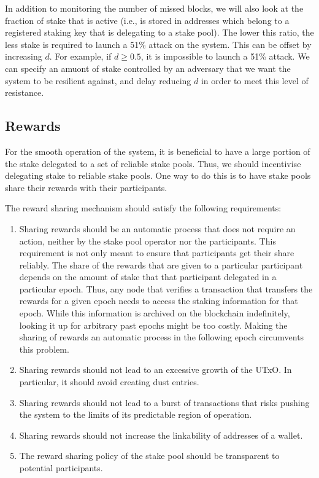 \documentclass[11pt,a4paper]{article}
\begin{document}
In addition to monitoring the number of missed blocks, we will also look
at the fraction of stake that is active (i.e., is stored in addresses
which belong to a registered staking key that is delegating to a stake
pool). The lower this ratio, the less stake is required to launch a 51\%
attack on the system. This can be offset by increasing \(d\). For
example, if \(d \geq 0.5\), it is impossible to launch a 51\% attack. We
can specify an amuont of stake controlled by an adversary that we want
the system to be resilient against, and delay reducing \(d\) in order to
meet this level of resistance.

\subsection{Rewards}
\label{rewards}

For the smooth operation of the system, it is beneficial to have a large
portion of the stake delegated to a set of reliable stake pools. Thus,
we should incentivise delegating stake to reliable stake pools. One way
to do this is to have stake pools share their rewards with their
participants.

The reward sharing mechanism should satisfy the following requirements:

\begin{enumerate}
\item
  Sharing rewards should be an automatic process that does not require
  an action, neither by the stake pool operator nor the participants.
  This requirement is not only meant to ensure that participants get
  their share reliably. The share of the rewards that are given to a
  particular participant depends on the amount of stake that that
  participant delegated in a particular epoch. Thus, any node that
  verifies a transaction that transfers the rewards for a given epoch
  needs to access the staking information for that epoch. While this
  information is archived on the blockchain indefinitely, looking it up
  for arbitrary past epochs might be too costly. Making the sharing of
  rewards an automatic process in the following epoch circumvents this
  problem.
\item
  Sharing rewards should not lead to an excessive growth of the UTxO. In
  particular, it should avoid creating dust entries.
\item
  Sharing rewards should not lead to a burst of transactions that risks
  pushing the system to the limits of its predictable region of
  operation.
\item\label{rewards-requirement-linkability}
  Sharing rewards should not increase the linkability of addresses of a
  wallet.
\item
  The reward sharing policy of the stake pool should be transparent to
  potential participants.
\end{enumerate}
\end{document}
